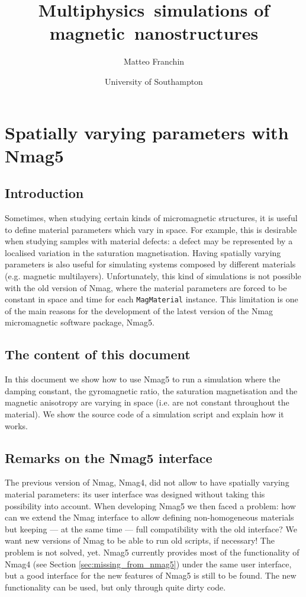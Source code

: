 \documentclass[11pt,oneside,openany]{article}
\begin{document}
\author{Matteo Franchin}

\title{Multiphysics~simulations of magnetic~nanostructures}
\date{University of Southampton}

\maketitle

\section{Spatially varying parameters with Nmag5}

\subsection{Introduction}
Sometimes, when studying certain kinds of micromagnetic structures, it is
useful to define material parameters which vary in space. For example, this is
desirable when studying samples with material defects: a defect may be
represented by a localised variation in the saturation magnetisation.  Having
spatially varying parameters is also useful for simulating systems composed by
different materials (e.g. magnetic multilayers).
Unfortunately, this kind of simulations is not possible with the old version of
Nmag, where the material parameters are forced to be constant in space and time
for each \verb|MagMaterial| instance. This limitation is one of the main
reasons for the development of the latest version of the Nmag micromagnetic
software package, Nmag5.

\subsection{The content of this document}
In this document we show how to use Nmag5 to run a simulation where the damping
constant, the gyromagnetic ratio, the saturation magnetisation and the magnetic
anisotropy are varying in space (i.e. are not constant throughout the
material).  We show the source code of a simulation script and explain how it
works.

\subsection{Remarks on the Nmag5 interface}
The previous version of Nmag, Nmag4, did not allow to have spatially varying
material parameters: its user interface was designed without taking this
possibility into account. When developing Nmag5 we then faced a problem: how
can we extend the Nmag interface to allow defining non-homogeneous materials
but keeping --- at the same time --- full compatibility with the old interface?
We want new versions of Nmag to be able to run old scripts, if necessary! The
problem is not solved, yet. Nmag5 currently provides most of the functionality
of Nmag4 (see Section \ref{sec:missing_from_nmag5}) under the same user
interface, but a good interface for the new features of Nmag5 is still to be
found.  The new functionality can be used, but only through quite dirty code.
\end{document}
